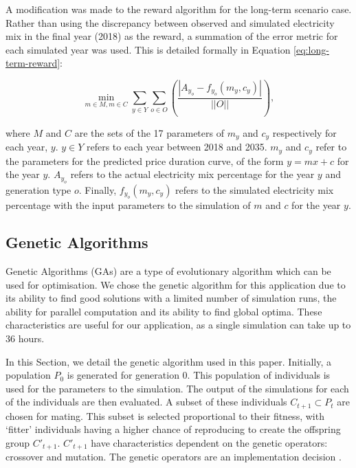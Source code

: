 A modification was made to the reward algorithm for the long-term scenario case. Rather than using the discrepancy between observed and simulated electricity mix in the final year (2018) as the reward, a summation of the error metric for each simulated year was used. This is detailed formally in Equation \ref{eq:long-term-reward}:


\begin{equation}
\label{eq:long-term-reward}
\min_{m\in M,m\in C} 
\sum\limits_{y\in Y}
\sum\limits_{o\in O}\left(
\frac{\left|A_{y_o}-f_{y_o}(m_y,c_y)\right|}
{\left|\left|O\right|\right|}
\right),
\end{equation}

\noindent where $M$ and $C$ are the sets of the 17 parameters of $m_y$ and $c_y$ respectively for each year, $y$. $y\in Y$ refers to each year between 2018 and 2035. $m_y$ and $c_y$ refer to the parameters for the predicted price duration curve, of the form $y=mx+c$ for the year $y$. $A_{y_o}$ refers to the actual electricity mix percentage for the year $y$ and generation type $o$. Finally, $f_{y_o}(m_y,c_y)$ refers to the simulated electricity mix percentage with the input parameters to the simulation of $m$ and $c$ for the year $y$.












\subsection{Genetic Algorithms}
\label{elecsim:ssec:geneticalgorithm}

Genetic Algorithms (GAs) are a type of evolutionary algorithm which can be used for optimisation. We chose the genetic algorithm for this application due to its ability to find good solutions with a limited number of simulation runs, the ability for parallel computation and its ability to find global optima. These characteristics are useful for our application, as a single simulation can take up to 36 hours. 

In this Section, we detail the genetic algorithm used in this paper. Initially, a population $P_{0}$ is generated for generation 0. This population of individuals is used for the parameters to the simulation. The output of the simulations for each of the individuals are then evaluated. A subset of these individuals $C_{t+1} \subset P_{t}$ are chosen for mating. This subset is selected proportional to their fitness, with `fitter' individuals having a higher chance of reproducing to create the offspring group $C'_{t+1}$. $C'_{t+1}$ have characteristics dependent on the genetic operators: crossover and mutation. The genetic operators are an implementation decision \cite{FogelDavidB2009}. 

